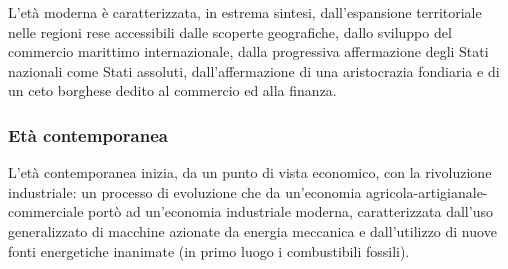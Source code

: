 L'età moderna è caratterizzata, in estrema sintesi, 
dall'espansione territoriale nelle regioni rese accessibili dalle scoperte 
geografiche, dallo sviluppo del commercio marittimo internazionale, dalla 
progressiva affermazione degli Stati nazionali come Stati 
assoluti, dall'affermazione di una aristocrazia fondiaria e di un ceto 
borghese dedito al commercio ed alla finanza.

% 
% 

\subsubsection{Età contemporanea}


L'età contemporanea inizia, da un punto di vista economico, con la rivoluzione 
industriale: un processo di evoluzione che da un'economia 
agricola-artigianale-commerciale 
portò ad un'economia industriale moderna, caratterizzata dall'uso 
generalizzato di macchine azionate da energia meccanica e 
dall'utilizzo di nuove fonti energetiche inanimate (in 
primo luogo i combustibili fossili).

